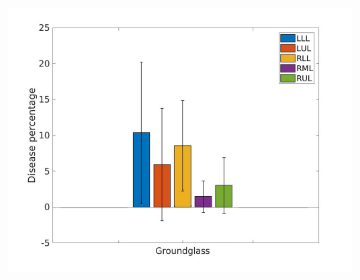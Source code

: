 \begin{figure}[H] 
\centering
\begin{subfigure}{.46\linewidth}%
  \includegraphics[width=\linewidth,trim={{.0\wd0} {.0\wd0} {.0\wd0} {.0\wd0}},clip]{QuantitativeAnalysis/Image/GroundglassLobarRegionDiseaseDistribution.jpg} %
  \caption{}
  \label{fig:LobarRegionDiseaseDistribution-a} 
\end{subfigure} 
\hspace{.3in}
\begin{subfigure}{.46\linewidth}%

\end{subfigure}
\end{figure}
